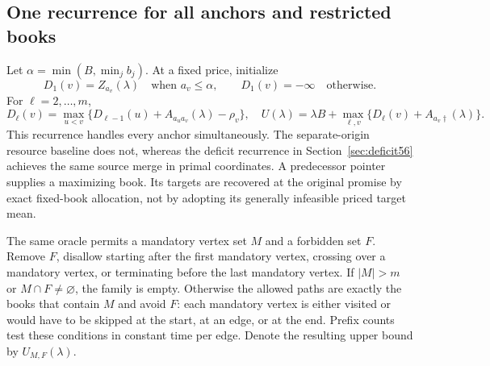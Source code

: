 \subsection{One recurrence for all anchors and restricted books}
Let $\alpha=\min(B,\min_jb_j)$. At a fixed price, initialize
\[
 D_1(v)=Z_{a_v}(\lambda)\quad\text{when }a_v\leq\alpha,
 \qquad D_1(v)=-\infty\quad\text{otherwise}.
\]
For $\ell=2,\ldots,m$,
\begin{equation}\label{eq:pricedDP54}
 D_\ell(v)=\max_{u<v}\{D_{\ell-1}(u)+A_{a_u a_v}(\lambda)-\rho_v\},
 \quad
 U(\lambda)=\lambda B+\max_{\ell,v}\{D_\ell(v)+A_{a_v\dagger}(\lambda)\}.
\end{equation}
This recurrence handles every anchor simultaneously. The separate-origin resource baseline does not, whereas the deficit recurrence in Section~\ref{sec:deficit56} achieves the same source merge in primal coordinates. A predecessor pointer supplies a maximizing book. Its targets are recovered at the original promise by exact fixed-book allocation, not by adopting its generally infeasible priced target mean.

The same oracle permits a mandatory vertex set $M$ and a forbidden set $F$. Remove $F$, disallow starting after the first mandatory vertex, crossing over a mandatory vertex, or terminating before the last mandatory vertex. If $|M|>m$ or $M\cap F\ne\varnothing$, the family is empty. Otherwise the allowed paths are exactly the books that contain $M$ and avoid $F$: each mandatory vertex is either visited or would have to be skipped at the start, at an edge, or at the end. Prefix counts test these conditions in constant time per edge. Denote the resulting upper bound by $U_{M,F}(\lambda)$.

